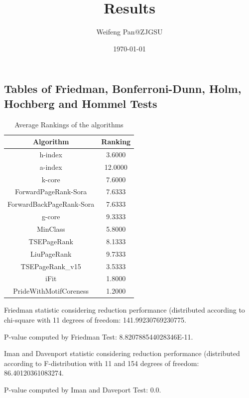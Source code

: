 \documentclass[a4paper,10pt]{article}
\title{Results}
\author{Weifeng Pan@ZJGSU}
\date{\today}
\begin{document}
\begin{landscape}
\oddsidemargin 0in \topmargin 0in\maketitle
\section{Tables of Friedman, Bonferroni-Dunn, Holm, Hochberg and Hommel Tests}
\begin{table}[!htp]
\centering
\caption{Average Rankings of the algorithms
}\begin{tabular}{c|c}
Algorithm&Ranking\\
\hline
h-index&3.6000\\
a-index&12.0000\\
k-core&7.6000\\
ForwardPageRank-Sora&7.6333\\
ForwardBackPageRank-Sora&7.6333\\
g-core&9.3333\\
MinClass&5.8000\\
TSEPageRank&8.1333\\
LiuPageRank&9.7333\\
TSEPageRank_v15&3.5333\\
iFit&1.8000\\
PrideWithMotifCoreness&1.2000\\
\end{tabular}
\end{table}


Friedman statistic considering reduction performance (distributed according to chi-square with 11 degrees of freedom: 141.99230769230775.


P-value computed by Friedman Test: 8.820788544028346E-11.\newline

Iman and Davenport statistic considering reduction performance (distributed according to F-distribution with 11 and 154 degrees of freedom: 86.40120361083274.


P-value computed by Iman and Daveport Test: 0.0.\newline


\end{landscape}
\end{document}
